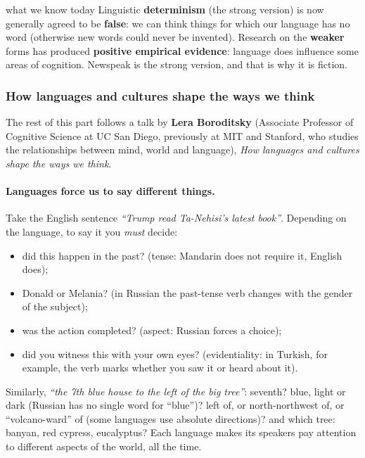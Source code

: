 \begin{nbfact}{what we know today}
Linguistic \textbf{determinism} (the strong version) is now generally agreed to be
\textbf{false}: we can think things for which our language has no word (otherwise new
words could never be invented). Research on the \textbf{weaker} forms has produced
\textbf{positive empirical evidence}: language does influence some areas of cognition.
Newspeak is the strong version, and that is why it is fiction.
\end{nbfact}

\subsubsection{How languages and cultures shape the ways we think}

The rest of this part follows a talk by \textbf{Lera Boroditsky} (Associate Professor of
Cognitive Science at UC San Diego, previously at MIT and Stanford, who studies the
relationships between mind, world and language), \emph{How languages and cultures shape
the ways we think}.

\paragraph{Languages force us to say different things.}
Take the English sentence \emph{``Trump read Ta-Nehisi's latest book''}. Depending on the
language, to say it you \emph{must} decide:
\begin{itemize}[nosep]
  \item did this happen in the past? (tense: Mandarin does not require it, English does);
  \item Donald or Melania? (in Russian the past-tense verb changes with the gender of the
        subject);
  \item was the action completed? (aspect: Russian forces a choice);
  \item did you witness this with your own eyes? (evidentiality: in Turkish, for
        example, the verb marks whether you saw it or heard about it).
\end{itemize}
Similarly, \emph{``the 7th blue house to the left of the big tree''}: seventh? blue, light
or dark (Russian has no single word for ``blue'')? left of, or north-northwest of, or
``volcano-ward'' of (some languages use absolute directions)? and which tree: banyan, red
cypress, eucalyptus? Each language makes its speakers pay attention to different
aspects of the world, all the time.

